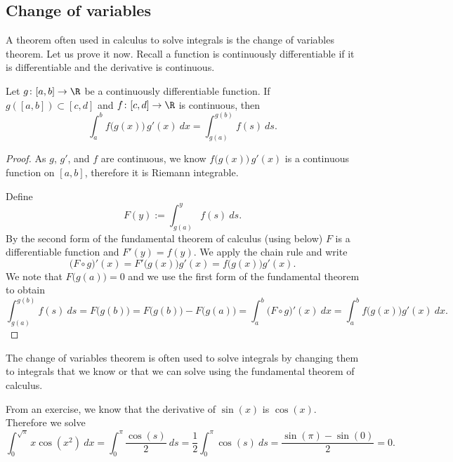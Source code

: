 \documentclass[12pt]{book}
\begin{document}
\subsection*{Change of variables}

A theorem often used in calculus to solve integrals is the change of
variables theorem.
Let us prove it now.
Recall 
a function is continuously differentiable if
it is differentiable and the derivative is continuous.

\begin{thm}
Let $g \colon [a,b] \to \R$ be a continuously differentiable function.
If $g([a,b]) \subset [c,d]$ and 
$f \colon [c,d] \to \R$ is continuous, then
\begin{equation*}
\int_a^b f\bigl(g(x)\bigr)\, g'(x)~ dx =
\int_{g(a)}^{g(b)} f(s)~ ds .
\end{equation*}
\end{thm}

\begin{proof}
As $g$, $g'$, and $f$ are continuous, we know $f\bigl(g(x)\bigr)\,g'(x)$
is a continuous function on $[a,b]$, therefore it is Riemann integrable.

Define 
\begin{equation*}
F(y) := \int_{g(a)}^{y} f(s)~ds .
\end{equation*}
By the second form of the fundamental
theorem of calculus (using  below)
$F$ is a differentiable function and $F'(y) = f(y)$.
We apply the chain
rule and write
\begin{equation*}
\bigl( F \circ g \bigr)' (x) =
F'\bigl(g(x)\bigr) g'(x)
=
f\bigl(g(x)\bigr) g'(x) .
\end{equation*}
We note that $F\bigl(g(a)\bigr) = 0$ and we
use the first form of the fundamental theorem
to obtain
\begin{equation*}
\int_{g(a)}^{g(b)} f(s)~ds = F\bigl(g(b)\bigr) = F\bigl(g(b)\bigr)-F\bigl(g(a)\bigr)
=
\int_a^b 
\bigl( F \circ g \bigr)' (x) ~dx
=
\int_a^b 
f\bigl(g(x)\bigr) g'(x)
~dx .%
\end{equation*}
\end{proof}

The change of variables theorem is often used to solve integrals by changing them
to integrals that we know or that we can solve using the fundamental theorem of
calculus.

\begin{example}
From an exercise, we know that the derivative of $\sin(x)$ is $\cos(x)$.
Therefore we solve
\begin{equation*}
\int_0^{\sqrt{\pi}} x \cos(x^2) ~ dx = \int_0^\pi \frac{\cos(s)}{2} ~ ds
=
\frac{1}{2}
\int_0^\pi \cos(s) ~ ds
=
\frac{
\sin(\pi) - \sin(0)
}{2}
=
0 .
\end{equation*}
\end{example}
\end{document}
